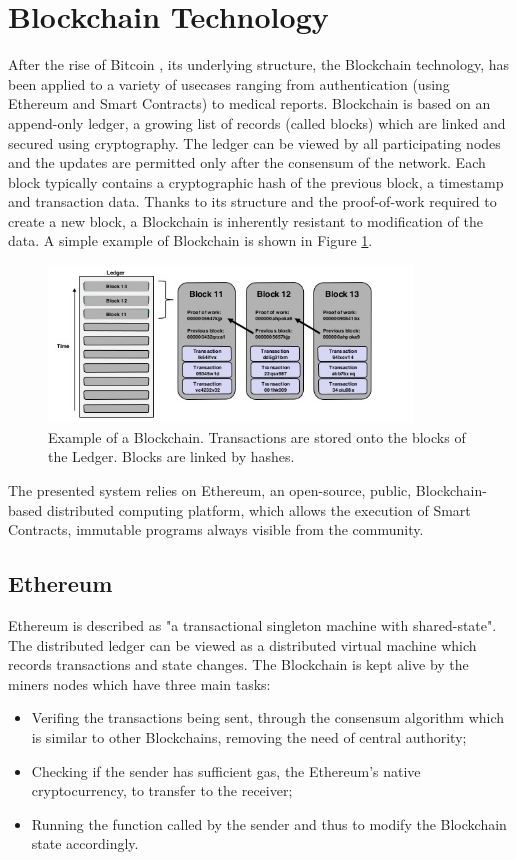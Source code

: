 \documentclass[hidelinks,conference,compsoc]{IEEEtran}
\begin{document}
\section{Blockchain Technology}
After the rise of Bitcoin \cite{nakamoto2008bitcoin}, its underlying structure, the Blockchain technology, has been applied to a variety of usecases ranging from authentication \cite{sundararajanonline} (using Ethereum and Smart Contracts) to medical reports\cite{azaria2016medrec}. Blockchain is based on an append-only ledger, a growing list of records (called blocks) which are linked and secured using cryptography. The ledger can be viewed by all participating nodes and the updates are permitted only after the consensum of the network. Each block typically contains a cryptographic hash of the previous block, a timestamp and transaction data. Thanks to its structure and the proof-of-work required to create a new block, a Blockchain is inherently resistant to modification of the data. A simple example of Blockchain is shown in Figure \ref{fig:blockchain}.\\
\begin{figure}[!h]
	\centering
	\includegraphics[width=3.8in]{images/blockchain.jpg}
	
	\caption{Example of a Blockchain. Transactions are stored onto the blocks of the Ledger. Blocks are linked by hashes.}
	\label{fig:blockchain}
\end{figure} 

The presented system relies on Ethereum, an open-source, public, Blockchain-based distributed computing platform, which allows the execution of Smart Contracts, immutable programs always visible from the community.


\subsection{Ethereum}
Ethereum \cite{wood2014ethereum} is described as "a transactional singleton machine with shared-state". 
The distributed ledger can be viewed as a distributed virtual machine which records transactions and state changes.
The Blockchain is kept alive by the miners nodes which have three main tasks:
\begin{itemize}
	\item Verifing the transactions being sent, through the consensum algorithm which is similar to other Blockchains, removing the need of central authority;
	\item Checking if the sender has sufficient gas, the Ethereum's native cryptocurrency, to transfer to the receiver;
	\item Running the function called by the sender and thus to modify the Blockchain state accordingly. 
\end{itemize}
\end{document}
